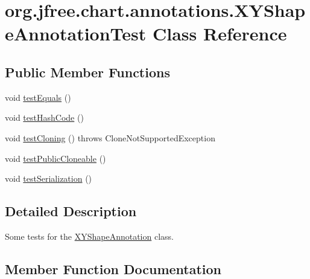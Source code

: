 \hypertarget{classorg_1_1jfree_1_1chart_1_1annotations_1_1_x_y_shape_annotation_test}{}\section{org.\+jfree.\+chart.\+annotations.\+X\+Y\+Shape\+Annotation\+Test Class Reference}
\label{classorg_1_1jfree_1_1chart_1_1annotations_1_1_x_y_shape_annotation_test}
\subsection*{Public Member Functions}
\begin{DoxyCompactItemize}
\item 
void \mbox{\hyperlink{classorg_1_1jfree_1_1chart_1_1annotations_1_1_x_y_shape_annotation_test_a912a78f37ad89fff5933d3b85ce988d5}{test\+Equals}} ()
\item 
void \mbox{\hyperlink{classorg_1_1jfree_1_1chart_1_1annotations_1_1_x_y_shape_annotation_test_a36853b3282443e3a7d32335eb5d94ba0}{test\+Hash\+Code}} ()
\item 
void \mbox{\hyperlink{classorg_1_1jfree_1_1chart_1_1annotations_1_1_x_y_shape_annotation_test_a5a096dff7ce62c4ab13e984d88817e97}{test\+Cloning}} ()  throws Clone\+Not\+Supported\+Exception 
\item 
void \mbox{\hyperlink{classorg_1_1jfree_1_1chart_1_1annotations_1_1_x_y_shape_annotation_test_a7a6b8eca9d66b8ebf5a325bf7377d697}{test\+Public\+Cloneable}} ()
\item 
void \mbox{\hyperlink{classorg_1_1jfree_1_1chart_1_1annotations_1_1_x_y_shape_annotation_test_ab91d2104912483cfec61448389f1f51d}{test\+Serialization}} ()
\end{DoxyCompactItemize}


\subsection{Detailed Description}
Some tests for the \mbox{\hyperlink{classorg_1_1jfree_1_1chart_1_1annotations_1_1_x_y_shape_annotation}{X\+Y\+Shape\+Annotation}} class. 

\subsection{Member Function Documentation}
\mbox{\label{classorg_1_1jfree_1_1chart_1_1annotations_1_1_x_y_shape_annotation_test_a5a096dff7ce62c4ab13e984d88817e97}} 
